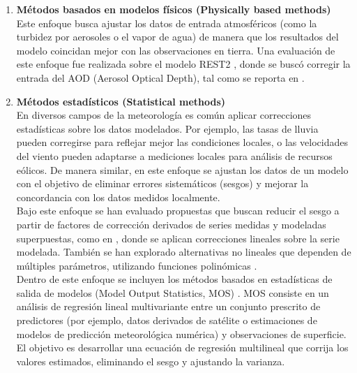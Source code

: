 \begin{enumerate}
    \item \textbf{Métodos basados en modelos físicos (Physically based methods)}\\
    Este enfoque busca ajustar los datos de entrada atmosféricos (como la turbidez por aerosoles o el vapor de agua) de manera que los resultados del modelo coincidan mejor con las observaciones en tierra. Una evaluación de este enfoque fue realizada sobre el modelo REST2 \citep{Gueymard2008}, donde se buscó corregir la entrada del AOD (Aerosol Optical Depth), tal como se reporta en \citep{Gueymard2012}.
    
    \item \textbf{Métodos estadísticos (Statistical methods)}\\
    En diversos campos de la meteorología es común aplicar correcciones estadísticas sobre los datos modelados. Por ejemplo, las tasas de lluvia pueden corregirse para reflejar mejor las condiciones locales, o las velocidades del viento pueden adaptarse a mediciones locales para análisis de recursos eólicos. De manera similar, en este enfoque se ajustan los datos de un modelo con el objetivo de eliminar errores sistemáticos (sesgos) y mejorar la concordancia con los datos medidos localmente.\\
    
    Bajo este enfoque se han evaluado propuestas que buscan reducir el sesgo a partir de factores de corrección derivados de series medidas y modeladas superpuestas, como en \citep{Polo2015, Harmsen2014}, donde se aplican correcciones lineales sobre la serie modelada. También se han explorado alternativas no lineales que dependen de múltiples parámetros, utilizando funciones polinómicas \citep{Carow2008}.\\
    
    Dentro de este enfoque se incluyen los métodos basados en estadísticas de salida de modelos (Model Output Statistics, MOS) \citep{Bender2011}. MOS consiste en un análisis de regresión lineal multivariante entre un conjunto prescrito de predictores (por ejemplo, datos derivados de satélite o estimaciones de modelos de predicción meteorológica numérica) y observaciones de superficie. El objetivo es desarrollar una ecuación de regresión multilineal que corrija los valores estimados, eliminando el sesgo y ajustando la varianza.\\
    

\end{enumerate}
